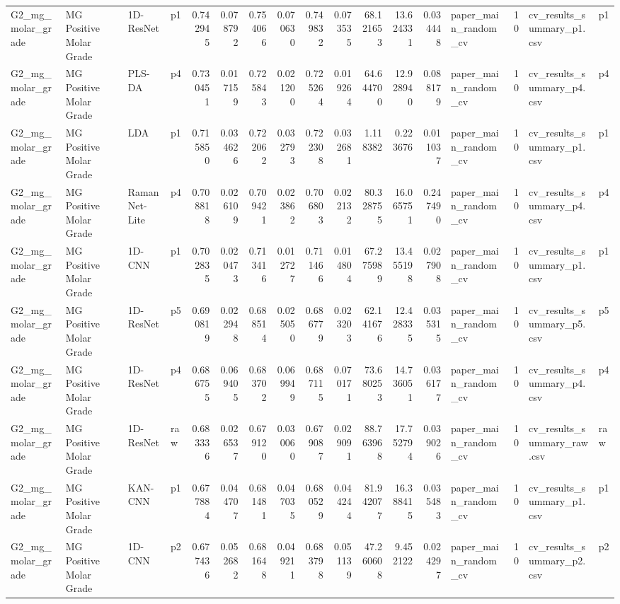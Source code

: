 \begin{tabular}{llllrrrrrrrrrlrll}
G2_mg_molar_grade & MG Positive Molar Grade & 1D-ResNet & p1 & 0.742945 & 0.078792 & 0.754066 & 0.070630 & 0.749832 & 0.073535 & 68.121653 & 13.624331 & 0.034448 & paper_main_random_cv & 10 & cv_results_summary_p1.csv & p1 \\
G2_mg_molar_grade & MG Positive Molar Grade & PLS-DA & p4 & 0.730451 & 0.017159 & 0.725843 & 0.021200 & 0.725264 & 0.019264 & 64.644700 & 12.928940 & 0.088179 & paper_main_random_cv & 10 & cv_results_summary_p4.csv & p4 \\
G2_mg_molar_grade & MG Positive Molar Grade & LDA & p1 & 0.715850 & 0.034626 & 0.722062 & 0.032793 & 0.722308 & 0.032681 & 1.118382 & 0.223676 & 0.011037 & paper_main_random_cv & 10 & cv_results_summary_p1.csv & p1 \\
G2_mg_molar_grade & MG Positive Molar Grade & RamanNet-Lite & p4 & 0.708818 & 0.026109 & 0.709421 & 0.023862 & 0.706803 & 0.022132 & 80.328755 & 16.065751 & 0.247490 & paper_main_random_cv & 10 & cv_results_summary_p4.csv & p4 \\
G2_mg_molar_grade & MG Positive Molar Grade & 1D-CNN & p1 & 0.702835 & 0.020473 & 0.713416 & 0.012727 & 0.711466 & 0.014804 & 67.275989 & 13.455198 & 0.027908 & paper_main_random_cv & 10 & cv_results_summary_p1.csv & p1 \\
G2_mg_molar_grade & MG Positive Molar Grade & 1D-ResNet & p5 & 0.690819 & 0.022948 & 0.688514 & 0.025050 & 0.686779 & 0.023203 & 62.141676 & 12.428335 & 0.035315 & paper_main_random_cv & 10 & cv_results_summary_p5.csv & p5 \\
G2_mg_molar_grade & MG Positive Molar Grade & 1D-ResNet & p4 & 0.686755 & 0.069405 & 0.683702 & 0.069949 & 0.687115 & 0.070171 & 73.680253 & 14.736051 & 0.036177 & paper_main_random_cv & 10 & cv_results_summary_p4.csv & p4 \\
G2_mg_molar_grade & MG Positive Molar Grade & 1D-ResNet & raw & 0.683336 & 0.026537 & 0.679120 & 0.030060 & 0.679087 & 0.029091 & 88.763968 & 17.752794 & 0.039026 & paper_main_random_cv & 10 & cv_results_summary_raw.csv & raw \\
G2_mg_molar_grade & MG Positive Molar Grade & KAN-CNN & p1 & 0.677884 & 0.044707 & 0.681481 & 0.047035 & 0.680529 & 0.044244 & 81.942077 & 16.388415 & 0.035483 & paper_main_random_cv & 10 & cv_results_summary_p1.csv & p1 \\
G2_mg_molar_grade & MG Positive Molar Grade & 1D-CNN & p2 & 0.677436 & 0.052682 & 0.681648 & 0.049211 & 0.683798 & 0.051139 & 47.260608 & 9.452122 & 0.024297 & paper_main_random_cv & 10 & cv_results_summary_p2.csv & p2 \\

\end{tabular}
